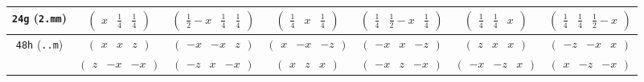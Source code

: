 \documentclass[fleqn,9pt,landscape]{jsarticle}
\begin{document}
\begin{center}
\begin{longtable}{ccccccc}
{\tt 24g} ({\tt 2.mm}) & $ \begin{pmatrix} x & \frac{1}{4} & \frac{1}{4} \end{pmatrix} $ & $ \begin{pmatrix} \frac{1}{2} - x & \frac{1}{4} & \frac{1}{4} \end{pmatrix} $ & $ \begin{pmatrix} \frac{1}{4} & x & \frac{1}{4} \end{pmatrix} $ & $ \begin{pmatrix} \frac{1}{4} & \frac{1}{2} - x & \frac{1}{4} \end{pmatrix} $ & $ \begin{pmatrix} \frac{1}{4} & \frac{1}{4} & x \end{pmatrix} $ & $ \begin{pmatrix} \frac{1}{4} & \frac{1}{4} & \frac{1}{2} - x \end{pmatrix} $ \\ \hline
{\tt 48h} ({\tt ..m}) & $ \begin{pmatrix} x & x & z \end{pmatrix} $ & $ \begin{pmatrix} - x & - x & z \end{pmatrix} $ & $ \begin{pmatrix} x & - x & - z \end{pmatrix} $ & $ \begin{pmatrix} - x & x & - z \end{pmatrix} $ & $ \begin{pmatrix} z & x & x \end{pmatrix} $ & $ \begin{pmatrix} - z & - x & x \end{pmatrix} $ \\
& $ \begin{pmatrix} z & - x & - x \end{pmatrix} $ & $ \begin{pmatrix} - z & x & - x \end{pmatrix} $ & $ \begin{pmatrix} x & z & x \end{pmatrix} $ & $ \begin{pmatrix} - x & z & - x \end{pmatrix} $ & $ \begin{pmatrix} - x & - z & x \end{pmatrix} $ & $ \begin{pmatrix} x & - z & - x \end{pmatrix} $ \\ \hline

\end{longtable}
\end{center}
\end{document}
